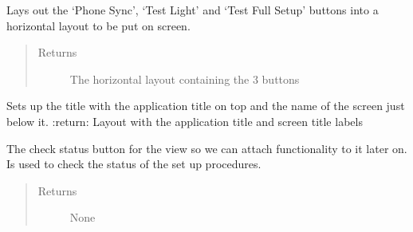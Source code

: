 \documentclass[letterpaper,10pt,english]{sphinxmanual}
\begin{document}
\begin{fulllineitems}
\begin{fulllineitems}
\begin{quote}
\begin{description}
\end{description}\end{quote}

\end{fulllineitems}


\begin{fulllineitems}
\label{\detokenize{index:src.Views.View_VerifySetupScreen.VerifySetupWindow.setButtonLayout}}
Lays out the ‘Phone Sync’, ‘Test Light’ and ‘Test Full Setup’ buttons into a horizontal layout to be
put on screen.
\begin{quote}\begin{description}
\item[{Returns}] \leavevmode
The horizontal layout containing the 3 buttons

\end{description}\end{quote}

\end{fulllineitems}


\begin{fulllineitems}
\label{\detokenize{index:src.Views.View_VerifySetupScreen.VerifySetupWindow.setTitle}}
Sets up the title with the application title on top and the name of the screen just below it.
:return: Layout with the application title and screen title labels

\end{fulllineitems}


\begin{fulllineitems}
\label{\detokenize{index:src.Views.View_VerifySetupScreen.VerifySetupWindow.set_BtnCheck}}
The check status button for the view so we can attach functionality to it later on.
Is used to check the status of the set up procedures.
\begin{quote}\begin{description}
\item[{Returns}] \leavevmode
None


\end{description}
\end{quote}
\end{fulllineitems}
\end{fulllineitems}
\end{document}

